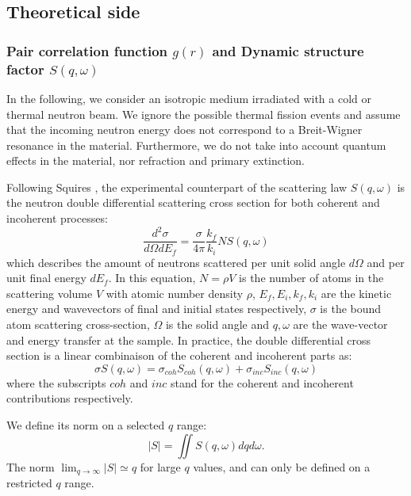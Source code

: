 \subsection{Theoretical side}

\subsubsection{Pair correlation function $g(r)$ and Dynamic structure factor $S(q,\omega)$}

In the following, we consider an isotropic medium irradiated with a cold or thermal neutron beam. We ignore the possible thermal fission events and assume that the incoming neutron energy does not correspond to a Breit-Wigner resonance in the material. Furthermore, we do not take into account quantum effects in the material, nor refraction and primary extinction.

Following Squires \cite{squires}, the experimental counterpart of the scattering law $S(q,\omega)$ is the neutron double differential scattering cross section for both coherent and incoherent processes:
\begin{equation}\label{eq:d2sigma}
\frac{d^2\sigma}{d\Omega dE_f} = \frac{\sigma}{4\pi}\frac{k_f}{k_i} N S(q, \omega)
\end{equation}
which describes the amount of neutrons scattered per unit solid angle $d\Omega$ and per unit final energy $dE_f$. In this equation, $N=\rho V$ is the number of atoms in the scattering volume $V$ with atomic number density $\rho$, $E_f, E_i, k_f, k_i$ are the kinetic energy and wavevectors of final and initial states respectively, $\sigma$ is the bound atom scattering cross-section, $\Omega$ is the solid angle and $q,\omega$ are the wave-vector and energy transfer at the sample. In practice, the double differential cross section is a linear combinaison of the coherent and incoherent parts as:
\begin{equation}
\label{eq:S=coh+inc}
\sigma S(q,\omega) = \sigma_{coh} S_{coh}(q,\omega) + \sigma_{inc} S_{inc}(q,\omega)
\end{equation}
where the subscripts $coh$ and $inc$ stand for the coherent and incoherent contributions respectively.

We define its norm on a selected $q$ range:
\begin{equation}
|S| = \iint S(q,\omega) dq d\omega .
\end{equation}
The norm $\lim_{q \rightarrow \infty} |S| \simeq q$ for large $q$ values, and can only be defined on a restricted $q$ range.


